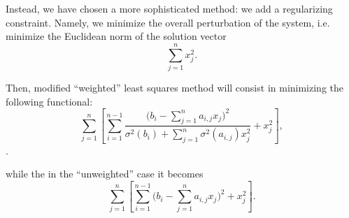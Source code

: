 Instead, we have chosen a more sophisticated method: we add a regularizing
constraint. Namely, we minimize the overall perturbation of the system, i.e.
minimize the Euclidean norm of the solution vector
\begin{equation}
  \label{eq:EuclideanNorm}
  \displaystyle\sum\limits_{j=1}^n x_j^2.
\end{equation}

Then, modified ``weighted'' least squares method will consist in minimizing the
following functional:
\begin{equation}
  \label{eq:LeastSquareSolution}
  \displaystyle\sum\limits_{j=1}^n
  \left[
  \displaystyle\sum\limits_{i=1}^{n-1}
          \frac{\bigg(    b_i  - \displaystyle\sum\limits_{j=1}^n         a_{i,j} x_j \bigg)^2}
               { \sigma^2(b_i) + \displaystyle\sum\limits_{j=1}^n\sigma^2(a_{i,j})x_j^2}
  + x_j^2
  \right]
  ,
\end{equation}.




while the in the ``unweighted'' case it becomes
\begin{equation}
  \label{eq:UnweightedLeastSquareSolution}
  \displaystyle\sum\limits_{j=1}^n
  \left[
  \displaystyle\sum\limits_{i=1}^{n-1}
          \bigg(          b_i  - \displaystyle\sum\limits_{j=1}^n         a_{i,j} x_j \bigg)^2
  + x_j^2
  \right]
  .
\end{equation}

